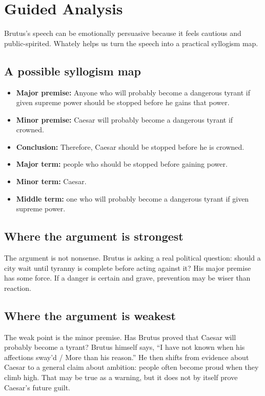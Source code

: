 \documentclass[12pt]{article}
\begin{document}
\section*{Guided Analysis}
Brutus's speech can be emotionally persuasive because it feels cautious and public-spirited. Whately helps us turn the speech into a practical syllogism map.

\subsection*{A possible syllogism map}
\begin{itemize}[leftmargin=*]
\item \textbf{Major premise:} Anyone who will probably become a dangerous tyrant if given supreme power should be stopped before he gains that power.
\item \textbf{Minor premise:} Caesar will probably become a dangerous tyrant if crowned.
\item \textbf{Conclusion:} Therefore, Caesar should be stopped before he is crowned.
\item \textbf{Major term:} people who should be stopped before gaining power.
\item \textbf{Minor term:} Caesar.
\item \textbf{Middle term:} one who will probably become a dangerous tyrant if given supreme power.
\end{itemize}

\subsection*{Where the argument is strongest}
The argument is not nonsense. Brutus is asking a real political question: should a city wait until tyranny is complete before acting against it? His major premise has some force. If a danger is certain and grave, prevention may be wiser than reaction.

\subsection*{Where the argument is weakest}
The weak point is the minor premise. Has Brutus proved that Caesar will probably become a tyrant? Brutus himself says, ``I have not known when his affections sway'd / More than his reason.'' He then shifts from evidence about Caesar to a general claim about ambition: people often become proud when they climb high. That may be true as a warning, but it does not by itself prove Caesar's future guilt.
\end{document}
